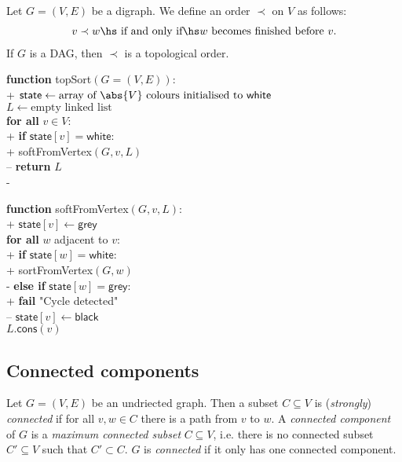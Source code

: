 \documentclass{article}
\begin{document}
\begin{theorem}
	Let $G=(V,E)$ be a digraph. We define an order $\prec$ on $V$ as follows:
	\begin{align*}
		v\prec w \hs\text{ if and only if}\hs\text{$w$ becomes finished before $v$}.
	\end{align*}
	If $G$ is a DAG, then $\prec$ is a topological order.
\end{theorem}

\begin{pseudo}
	\textbf{function} \textsf{topSort}$(G=(V,E))$:										\\+
	$\textsf{state}\leftarrow\text{array of $\abs{V}$ colours
			initialised to \textsf{white}}$												\\
	$L\leftarrow\text{empty linked list}$											\\
	\textbf{for all} $v\in V$:														\\+
	\textbf{if} $\textsf{state}[v] = \textsf{white}$:							\\+
	\textsf{softFromVertex}$(G,v,L)$										\\--
	\textbf{return} $L$																\\-
\end{pseudo}

\begin{pseudo}
	\textbf{function} \textsf{softFromVertex}$(G,v,L)$:									\\+
	$\textsf{state}[v]\leftarrow\textsf{grey}$										\\
	\textbf{for all} $w$ adjacent to $v$:											\\+
	\textbf{if} $\textsf{state}[w] = \textsf{white}$:							\\+
	\textsf{sortFromVertex}$(G,w)$											\\-
	\textbf{else if} $\textsf{state}[w] = \textsf{grey}$:						\\+
	\textbf{fail} "Cycle detected" 											\\--
	$\textsf{state}[v]\leftarrow \textsf{black}$									\\
	$L.\textsf{cons}(v)$
\end{pseudo}

\subsection{Connected components}

\begin{definition}[L15]
	Let $G=(V,E)$ be an undriected graph. Then a subset $C\subseteq V$ is
	(\emph{strongly}) \emph{connected} if for all $v,w\in C$ there is a path
	from $v$ to $w$. A \emph{connected component} of $G$ is a \emph{maximum
		connected subset} $C\subseteq V$, i.e. there is no connected subset
	$C'\subseteq V$ such that $C'\subset C$. $G$ is \emph{connected} if
	it only has one connected component.
\end{definition}
\end{document}
